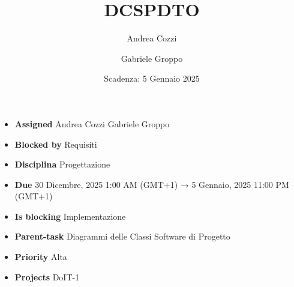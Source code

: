 \title{DCSPDTO}
\author{Andrea Cozzi \and Gabriele Groppo}
\date{Scadenza: 5 Gennaio 2025}

\maketitle

\begin{itemize}
    \item \textbf{Assigned} {Andrea Cozzi Gabriele Groppo}
    \item \textbf{Blocked by} Requisiti
    \item \textbf{Disciplina} Progettazione
    \item \textbf{Due} 30 Dicembre, 2025 1:00 AM (GMT+1) → 5 Gennaio, 2025 11:00 PM (GMT+1)
    \item \textbf{Is blocking} Implementazione
    \item \textbf{Parent-task} Diagrammi delle Classi Software di Progetto
    \item \textbf{Priority} Alta
    \item \textbf{Projects} DoIT-1
\end{itemize}